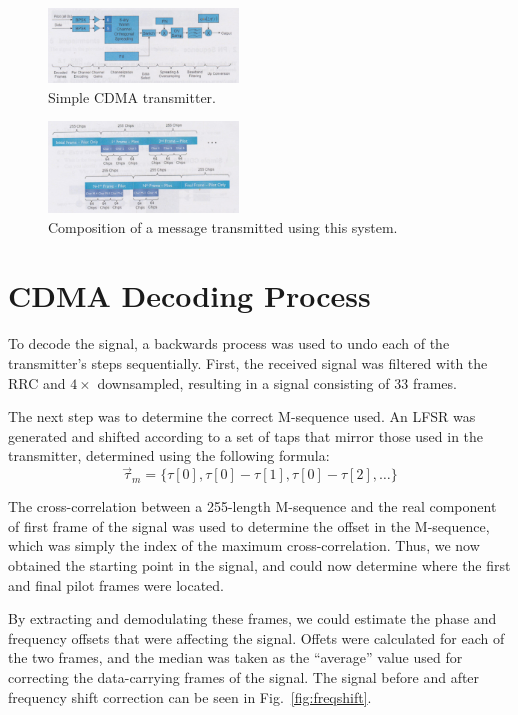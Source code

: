 \documentclass[journal]{IEEEtran}
\begin{document}
\begin{figure}[!htbp]
    \centering
    \includegraphics[width = 0.45\textwidth]{CDMA_transmitter.jpg}
    \caption{Simple CDMA transmitter.}
    \label{fig:transmitter}
\end{figure}

\begin{figure}[!htbp]
    \centering
    \includegraphics[width = 0.45\textwidth]{CDMA_sig.jpg}
    \caption{Composition of a message transmitted using this system.}
    \label{fig:message}
\end{figure}

\section{CDMA Decoding Process} \label{sec:decoder}
To decode the signal, a backwards process was used to undo each of the transmitter's steps sequentially. First, the received signal was filtered with the RRC and $4\times$ downsampled, resulting in a signal consisting of 33 frames. 

The next step was to determine the correct M-sequence used. An LFSR was generated and shifted according to a set of taps that mirror those used in the transmitter, determined using the following formula:
\begin{equation}
	\vec{\tau}_m = \{\tau[0], \tau[0] - \tau[1], \tau[0] - \tau[2], \ldots\}
\end{equation}

The cross-correlation between a 255-length M-sequence and the real component of first frame of the signal was used to determine the offset in the M-sequence, which was simply the index of the maximum cross-correlation. Thus, we now obtained the starting point in the signal, and could now determine where the first and final pilot frames were located.

By extracting and demodulating these frames, we could estimate the phase and frequency offsets that were affecting the signal. Offets were calculated for each of the two frames, and the median was taken as the ``average'' value used for correcting the data-carrying frames of the signal. The signal before and after frequency shift correction can be seen in Fig.~\ref{fig:freqshift}.
\end{document}
